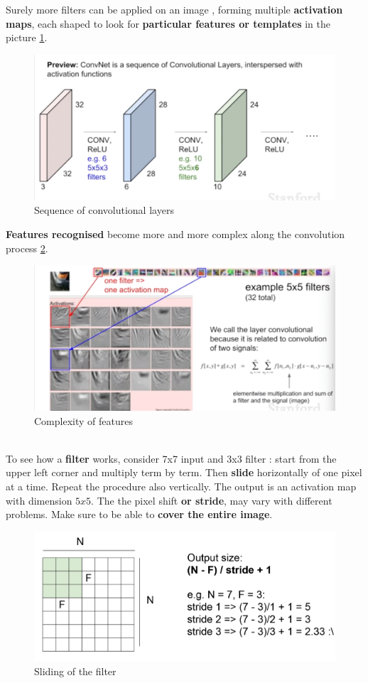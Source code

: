 \documentclass[11pt]{article}
\begin{document}
Surely more filters can be applied on an image , forming multiple \textbf{activation maps}, each shaped to look for \textbf{particular features or templates} in the picture \ref{fig:L412}.
\begin{figure}[h]
\centering
\captionsetup{justification=centering}
\includegraphics[width=0.7\linewidth]{L412.pdf}
\caption{ Sequence of convolutional layers}
\label{fig:L412}
\end{figure}
\clearpage
\textbf{Features recognised} become more and more complex along the convolution process \ref{fig:L413}.
\begin{figure}[h]
\centering
\captionsetup{justification=centering}
\includegraphics[width=0.8\linewidth]{L413.pdf}
\caption{ Complexity of features}
\label{fig:L413}
\end{figure}\\
To see how a \textbf{filter} works, consider 7x7 input and 3x3 filter : start from the upper left corner and multiply term by term. Then \textbf{slide} horizontally of one pixel at a time. Repeat the procedure also vertically. 
The output is an activation map with dimension $5x5$. The the pixel shift \textbf{or stride}, may vary with different problems. Make sure to be able to \textbf{cover the entire image}.
\begin{figure}[h]
\centering
\captionsetup{justification=centering}
\includegraphics[width=0.7\linewidth]{L414.pdf}
\caption{ Sliding of the filter}
\label{fig:L414}
\end{figure}\\
\end{document}
